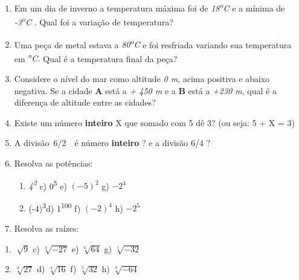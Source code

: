 \documentclass[12pt]{article}
\renewcommand{\_}{\kern-1.5pt\textunderscore\kern-1.5pt}
\begin{document}
\begin{enumerate}
	\item Em um dia de inverno a temperatura máxima foi de \textit{18\textsuperscript{o}C} e a mínima de \textit{-3\textsuperscript{o}C} . Qual foi a variação de temperatura?\par

	\item Uma peça de metal estava a \textit{80\textsuperscript{o}C }e foi resfriada variando sua temperatura em\textit{ \textsuperscript{o}C. }Qual é a temperatura final da peça?\par

	\item Considere o nível do mar como altitude \textit{0 m}, acima positiva e abaixo negativa. Se a cidade \textbf{A} está a \textit{+ 450 m} e a \textbf{B} está a \textit{+230 m}, qual é a diferença de altitude \tab entre as cidades?\par

	\item Existe um número \textbf{inteiro} X que somado com 5 dê 3? (ou seja: 5 + X = 3)\par

	\item A divisão\  6/2\ \ é  número \textbf{inteiro} ? e a divisão 6/4 ?\par

	\item Resolva as potências:\par

\setlength{\parskip}{8.04pt}
\begin{enumerate}
	\item \textit{4\textsuperscript{2}} \tab \tab c) 0\textsuperscript{5} \tab \tab e)  \(  \left( -5 \right) ^{2} \) \tab \tab g)  \( -2^{4} \) \par

	\item (-4)\textsuperscript{3\tab }\tab d) 1\textsuperscript{100} \tab \tab f)  \(  \left( -2 \right) ^{4} \) \tab \tab h)  \( -2^{5} \) 
\end{enumerate}\par

\setlength{\parskip}{0.0pt}
	\item  Resolva as raízes:
\end{enumerate}\par

\begin{enumerate}
	\item  \( \sqrt[]{9} \)  \tab \tab c)  \( \sqrt[3]{-27} \)  \tab e)  \( \sqrt[6]{64} \)  \tab g)  \( \sqrt[5]{-32} \) \par

	\item  \( \sqrt[3]{27} \)  \tab \tab d)  \( \sqrt[4]{16} \) \tab \tab f)  \( \sqrt[5]{32} \) \tab \tab h)  \( \sqrt[3]{-64} \) \  
\end{enumerate}\par
\end{document}
